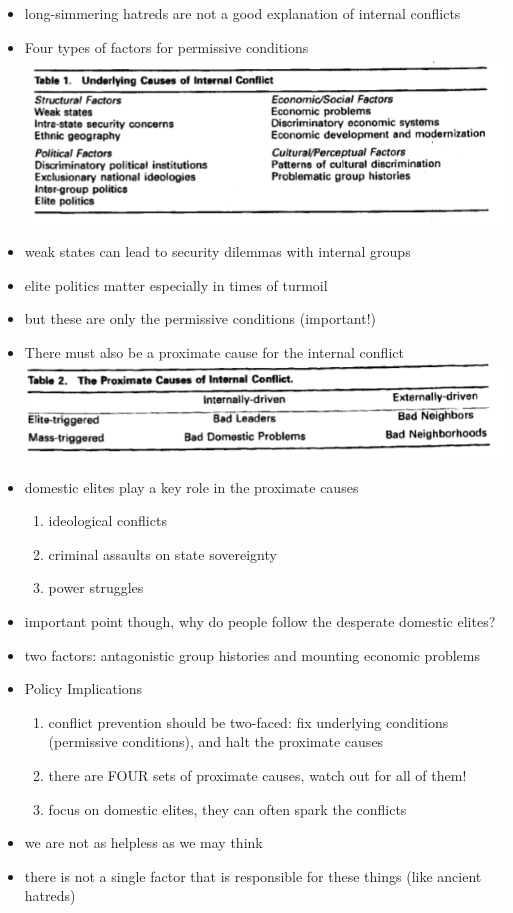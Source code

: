 \documentclass{article}
\begin{document}
\begin{itemize}
    \item long-simmering hatreds are not a good explanation of internal conflicts
    \item Four types of factors for permissive conditions\\
    \includegraphics[width=\textwidth]{permissiveconditions.png}
    \item weak states can lead to security dilemmas with internal groups
    \item elite politics matter especially in times of turmoil
    \item but these are only the permissive conditions (important!)
    \item There must also be a proximate cause for the internal conflict\\
    \includegraphics[width=\textwidth]{proximatecauses.png}
    \item domestic elites play a key role in the proximate causes
    \begin{enumerate}
        \item ideological conflicts
        \item criminal assaults on state sovereignty
        \item power struggles
    \end{enumerate}
    \item important point though, why do people follow the desperate domestic elites?
    \item two factors: antagonistic group histories and mounting economic problems
    \item Policy Implications
    \begin{enumerate}
        \item conflict prevention should be two-faced: fix underlying conditions (permissive conditions), and halt the proximate causes
        \item there are FOUR sets of proximate causes, watch out for all of them!
        \item focus on domestic elites, they can often spark the conflicts
    \end{enumerate}
    \item we are not as helpless as we may think
    \item there is not a single factor that is responsible for these things (like ancient hatreds)
\end{itemize}
\end{document}
